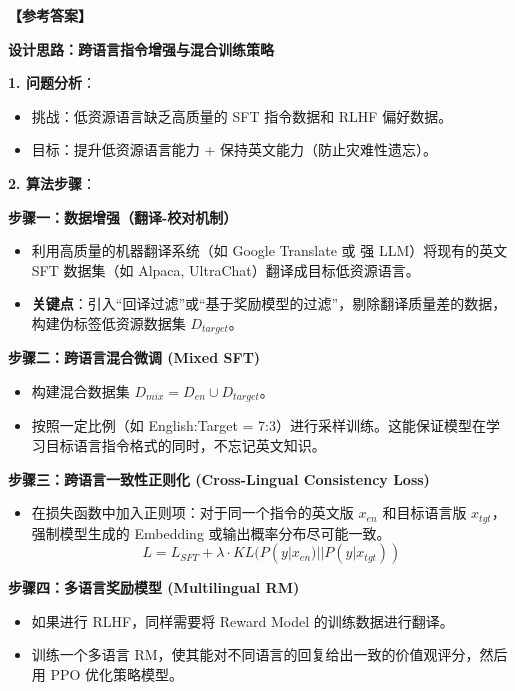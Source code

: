 \documentclass[a4paper,11pt]{article}
\newenvironment{answer}
    {\noindent\textbf{【参考答案】}\par\small\color{blue}}
    {\par\vspace{0.5cm}\normalcolor}
\begin{document}
\begin{answer}
\textbf{设计思路：跨语言指令增强与混合训练策略}

\textbf{1. 问题分析}：
\begin{itemize}
    \item 挑战：低资源语言缺乏高质量的 SFT 指令数据和 RLHF 偏好数据。
    \item 目标：提升低资源语言能力 + 保持英文能力（防止灾难性遗忘）。
\end{itemize}

\textbf{2. 算法步骤}：

\textbf{步骤一：数据增强（翻译-校对机制）}
\begin{itemize}
    \item 利用高质量的机器翻译系统（如 Google Translate 或 强 LLM）将现有的英文 SFT 数据集（如 Alpaca, UltraChat）翻译成目标低资源语言。
    \item \textbf{关键点}：引入“回译过滤”或“基于奖励模型的过滤”，剔除翻译质量差的数据，构建伪标签低资源数据集 $D_{target}$。
\end{itemize}

\textbf{步骤二：跨语言混合微调 (Mixed SFT)}
\begin{itemize}
    \item 构建混合数据集 $D_{mix} = D_{en} \cup D_{target}$。
    \item 按照一定比例（如 English:Target = 7:3）进行采样训练。这能保证模型在学习目标语言指令格式的同时，不忘记英文知识。
\end{itemize}

\textbf{步骤三：跨语言一致性正则化 (Cross-Lingual Consistency Loss)}
\begin{itemize}
    \item 在损失函数中加入正则项：对于同一个指令的英文版 $x_{en}$ 和目标语言版 $x_{tgt}$，强制模型生成的 Embedding 或输出概率分布尽可能一致。
    $$ L = L_{SFT} + \lambda \cdot KL(P(y|x_{en}) || P(y|x_{tgt})) $$
\end{itemize}

\textbf{步骤四：多语言奖励模型 (Multilingual RM)}
\begin{itemize}
    \item 如果进行 RLHF，同样需要将 Reward Model 的训练数据进行翻译。
    \item 训练一个多语言 RM，使其能对不同语言的回复给出一致的价值观评分，然后用 PPO 优化策略模型。
\end{itemize}
\end{answer}

\newpage
\end{document}
